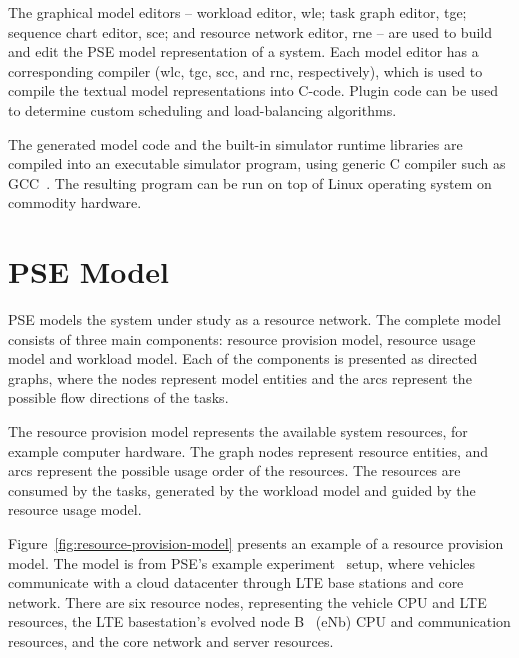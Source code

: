 The graphical model editors -- workload editor, wle; task graph editor, tge; sequence chart editor, sce; and resource network editor, rne -- are used to build and edit the PSE model representation of a system. Each model editor has a corresponding compiler (wlc, tgc, scc, and rnc, respectively), which is used to compile the textual model representations into C-code. Plugin code can be used to determine custom scheduling and load-balancing algorithms.

The generated model code and the built-in simulator runtime libraries are compiled into an executable simulator program, using generic C compiler such as GCC~\cite{stallman:2009:gcc}. The resulting program can be run on top of Linux operating system on commodity hardware.

\section{PSE Model}
PSE models the system under study as a resource network. The complete model consists of three main components: resource provision model, resource usage model and workload model. Each of the components is presented as directed graphs, where the nodes represent model entities and the arcs represent the possible flow directions of the tasks.

The resource provision model represents the available system resources, for example computer hardware. The graph nodes represent resource entities, and arcs represent the possible usage order of the resources. The resources are consumed by the tasks, generated by the workload model and guided by the resource usage model.

Figure~\ref{fig:resource-provision-model} presents an example of a resource provision model. The model is from PSE's example experiment~\cite{TODO: add cite to the PSE} setup, where vehicles communicate with a cloud datacenter through LTE base stations and core network. There are six resource nodes, representing the vehicle CPU and LTE resources, the LTE basestation's evolved node B~\cite{Sesia:2009:LTE} (eNb) CPU and communication resources, and the core network and server resources.

